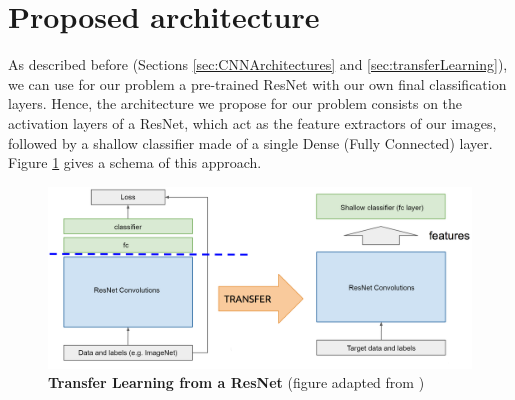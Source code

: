 


\section{Proposed architecture}\label{sec:dl_architecture}

As described before (Sections \ref{sec:CNNArchitectures} and \ref{sec:transferLearning}), we can use for our problem a pre-trained ResNet with our own final classification layers. Hence, the architecture we propose for our problem consists on the activation layers of a ResNet, which act as the feature extractors of our images, followed by a shallow classifier made of a single Dense (Fully Connected) layer. Figure \ref{fig:transfer_learning} gives a schema of this approach.

\begin{figure}[h!]
	\centering
	\captionsetup{width=1\linewidth}
	\includegraphics[width=1\textwidth]{Figures/transfer_learning.png}
	\caption{\textbf{Transfer Learning from a ResNet} (figure adapted from \parencite{McGuinness2017})}
	\label{fig:transfer_learning}
\end{figure}

